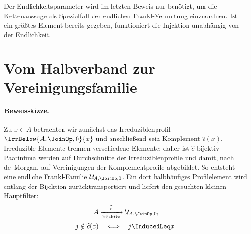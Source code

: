 \documentclass[main.tex]{subfiles}
\begin{document}
\begin{tabproofsplitwide}
  \closeproofpartwide
\end{tabproofsplitwide}

Der Endlichkeitsparameter wird im letzten Beweis nur benötigt, um die
Kettenaussage als Spezialfall der endlichen Frankl-Vermutung einzuordnen. Ist
ein größtes Element bereits gegeben, funktioniert die Injektion unabhängig
von der Endlichkeit.


\section{Vom Halbverband zur Vereinigungsfamilie}

\paragraph{Beweisskizze.}
Zu \(x\in A\) betrachten wir zunächst das Irreduziblenprofil
\(\IrrBelow{A,\JoinOp,0}{x}\) und anschließend sein Komplement
\(\widehat c(x)\). Irreduzible Elemente trennen verschiedene Elemente; daher
ist \(\widehat c\) bijektiv. Paarinfima werden auf Durchschnitte der
Irreduziblenprofile und damit, nach de~Morgan, auf Vereinigungen der
Komplementprofile abgebildet. So entsteht eine endliche Frankl-Familie
\(\mathcal U_{A,\JoinOp,0}\). Ein dort halbhäufiges Profilelement wird entlang
der Bijektion zurücktransportiert und liefert den gesuchten kleinen
Hauptfilter:
\[
  \begin{aligned}
    A&\xrightarrow[\text{bijektiv}]{\widehat c}
      \mathcal U_{A,\JoinOp,0},\\
    j\notin\widehat c(x)&\quad\Longleftrightarrow\quad j\InducedLeq x.
  \end{aligned}
\]

\end{document}
